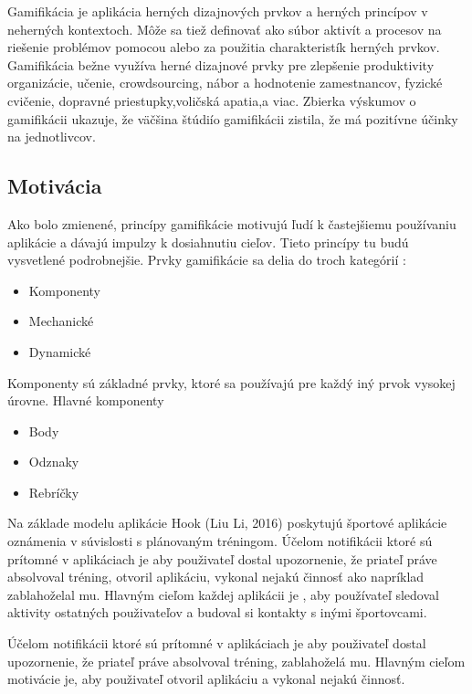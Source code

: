 \documentclass[10pt,twoside,slovak,a4paper]{article}
\begin{document}
\begin{figure*}[tbh]
Gamifikácia je aplikácia herných dizajnových prvkov a herných princípov v neherných kontextoch. Môže sa tiež definovať ako súbor aktivít a procesov na riešenie problémov pomocou alebo za použitia charakteristík herných prvkov. Gamifikácia bežne využíva herné dizajnové
prvky pre zlepšenie produktivity organizácie, učenie, crowdsourcing, nábor a hodnotenie zamestnancov, fyzické cvičenie, dopravné priestupky,voličská apatia,a viac. Zbierka výskumov o gamifikácii ukazuje, že väčšina štúdiío gamifikácii zistila, že má pozitívne účinky na jednotlivcov.\cite{Gamification-Framework}


\subsection{Motivácia} 

Ako bolo zmienené, princípy gamifikácie motivujú ľudí k častejšiemu používaniu aplikácie a dávajú impulzy k dosiahnutiu cieľov. Tieto princípy tu budú vysvetlené podrobnejšie. 
\label{prvky} Prvky gamifikácie sa delia do troch kategórií :
\begin{itemize}
  \item {Komponenty}
  \item {Mechanické}
  \item {Dynamické}
\end{itemize}
Komponenty sú základné prvky, ktoré sa používajú pre každý iný prvok vysokej úrovne. Hlavné komponenty
\begin{itemize}
  \item {Body}
  \item {Odznaky}
  \item {Rebríčky}
\end{itemize}

    
Na základe modelu aplikácie Hook (Liu Li, 2016) \cite{Improving_motivation-Framework} poskytujú športové aplikácie oznámenia v súvislosti s plánovaným tréningom. Účelom notifikácii ktoré sú prítomné v aplikáciach je aby použivateľ dostal  upozornenie, že priateľ práve absolvoval tréning, otvoril aplikáciu, vykonal nejakú činnosť ako napríklad zablahoželal mu. Hlavným cieľom každej aplikácii je , aby používateľ sledoval aktivity ostatných použivateľov a budoval si kontakty s inými športovcami.

Účelom notifikácii ktoré sú prítomné v aplikáciach je aby použivateľ dostal  upozornenie, že priateľ práve absolvoval tréning, zablahoželá mu. Hlavným cieľom motivácie je, aby použivateľ otvoril aplikáciu a vykonal nejakú činnosť.
\end{figure*}
\newpage
\end{document}
